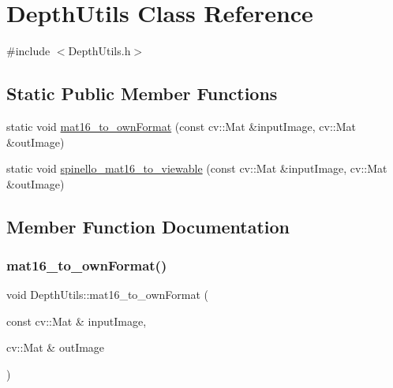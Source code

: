 \hypertarget{class_depth_utils}{}\section{Depth\+Utils Class Reference}
\label{class_depth_utils}


{\ttfamily \#include $<$Depth\+Utils.\+h$>$}

\subsection*{Static Public Member Functions}
\begin{DoxyCompactItemize}
\item 
static void \hyperlink{class_depth_utils_a5ba9ff6bb47e9810c8832ab733ada879}{mat16\+\_\+to\+\_\+own\+Format} (const cv\+::\+Mat \&input\+Image, cv\+::\+Mat \&out\+Image)
\item 
static void \hyperlink{class_depth_utils_aa27c57f9882e66c600a03a5378c00110}{spinello\+\_\+mat16\+\_\+to\+\_\+viewable} (const cv\+::\+Mat \&input\+Image, cv\+::\+Mat \&out\+Image)
\end{DoxyCompactItemize}


\subsection{Member Function Documentation}
\mbox{\label{class_depth_utils_a5ba9ff6bb47e9810c8832ab733ada879}} 
\subsubsection{\texorpdfstring{mat16\+\_\+to\+\_\+own\+Format()}{mat16\_to\_ownFormat()}}
{\footnotesize\ttfamily void Depth\+Utils\+::mat16\+\_\+to\+\_\+own\+Format (\begin{DoxyParamCaption}\item[{const cv\+::\+Mat \&}]{input\+Image,  }\item[{cv\+::\+Mat \&}]{out\+Image }\end{DoxyParamCaption})\hspace{0.3cm}{\ttfamily [static]}}

\mbox{\label{class_depth_utils_aa27c57f9882e66c600a03a5378c00110}} 
